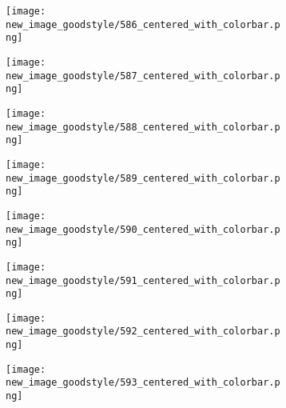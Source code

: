 \documentclass[a4paper,12pt]{article}
\begin{document}
\begin{figure}[H]
  \begin{subfigure}{0.11\textwidth}
    \texttt{[image: new\_image\_goodstyle/586\_centered\_with\_colorbar.png]}
  \end{subfigure}
  \hfill
  \begin{subfigure}{0.11\textwidth}
    \texttt{[image: new\_image\_goodstyle/587\_centered\_with\_colorbar.png]}
  \end{subfigure}
  \hfill
  \begin{subfigure}{0.11\textwidth}
    \texttt{[image: new\_image\_goodstyle/588\_centered\_with\_colorbar.png]}
  \end{subfigure}
  \hfill
  \begin{subfigure}{0.11\textwidth}
    \texttt{[image: new\_image\_goodstyle/589\_centered\_with\_colorbar.png]}
  \end{subfigure}
  \hfill
  \begin{subfigure}{0.11\textwidth}
    \texttt{[image: new\_image\_goodstyle/590\_centered\_with\_colorbar.png]}
  \end{subfigure}
  \hfill
  \begin{subfigure}{0.11\textwidth}
    \texttt{[image: new\_image\_goodstyle/591\_centered\_with\_colorbar.png]}
  \end{subfigure}
  \hfill
  \begin{subfigure}{0.11\textwidth}
    \texttt{[image: new\_image\_goodstyle/592\_centered\_with\_colorbar.png]}
  \end{subfigure}
  \hfill
  \begin{subfigure}{0.11\textwidth}
    \texttt{[image: new\_image\_goodstyle/593\_centered\_with\_colorbar.png]}
  \end{subfigure}
  \hfill
\end{figure}
\end{document}
